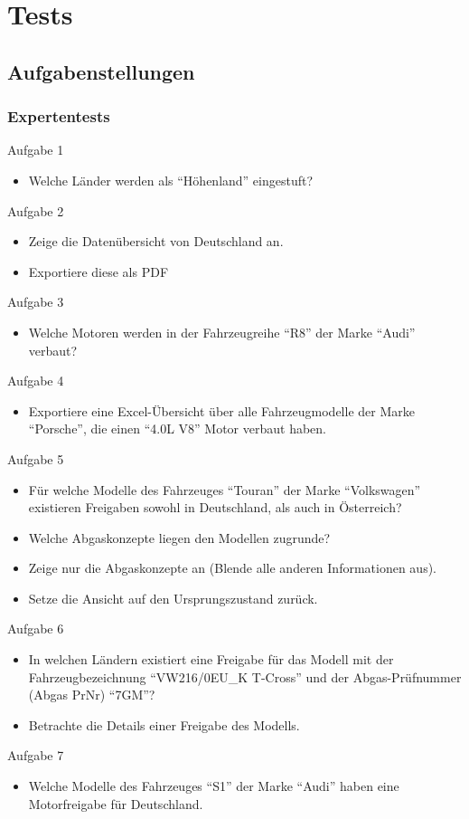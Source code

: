 \chapter{Tests}
\section{Aufgabenstellungen}
\subsection{Expertentests}
Aufgabe 1
\begin{itemize}
	\item Welche Länder werden als \enquote{Höhenland} eingestuft?
\end{itemize}
Aufgabe 2
\begin{itemize}
	\item Zeige die Datenübersicht von Deutschland an.
	\item Exportiere diese als PDF
\end{itemize}
Aufgabe 3
\begin{itemize}
	\item Welche Motoren werden in der Fahrzeugreihe \enquote{R8} der Marke \enquote{Audi} verbaut?
\end{itemize}
Aufgabe 4
\begin{itemize}
	\item Exportiere eine Excel-Übersicht über alle Fahrzeugmodelle der Marke \enquote{Porsche}, die einen \enquote{4.0L V8} Motor verbaut haben.
\end{itemize}
Aufgabe 5
\begin{itemize}
	\item Für welche Modelle des Fahrzeuges \enquote{Touran} der Marke \enquote{Volkswagen} existieren Freigaben sowohl in Deutschland, als auch in Österreich?
	\item Welche Abgaskonzepte liegen den Modellen zugrunde?
	\item Zeige nur die Abgaskonzepte an (Blende alle anderen Informationen aus).
	\item Setze die Ansicht auf den Ursprungszustand zurück.
\end{itemize}
Aufgabe 6
\begin{itemize}
	\item In welchen Ländern existiert eine Freigabe für das Modell mit der Fahrzeugbezeichnung \enquote{VW216/0EU\_{}K T-Cross} und der Abgas-Prüfnummer (Abgas PrNr) \enquote{7GM}?
	\item Betrachte die Details einer Freigabe des Modells.
\end{itemize}
Aufgabe 7
\begin{itemize}
	\item Welche Modelle des Fahrzeuges \enquote{S1} der Marke \enquote{Audi} haben eine Motorfreigabe für Deutschland.
\end{itemize}

